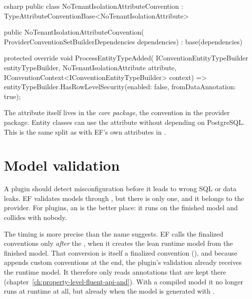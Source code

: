 \begin{sourcecode}{csharp}
public class NoTenantIsolationAttributeConvention
    : TypeAttributeConventionBase<NoTenantIsolationAttribute>
{
    public NoTenantIsolationAttributeConvention(
        ProviderConventionSetBuilderDependencies dependencies)
        : base(dependencies)
    {
    }

    protected override void ProcessEntityTypeAdded(
        IConventionEntityTypeBuilder entityTypeBuilder,
        NoTenantIsolationAttribute attribute,
        IConventionContext<IConventionEntityTypeBuilder> context)
        => entityTypeBuilder.HasRowLevelSecurity(enabled: false, fromDataAnnotation: true);
}
\end{sourcecode}

\begin{tip}
  The attribute itself lives in the \emph{core package}, the convention in the provider
  package. Entity classes can use the attribute without depending on PostgreSQL. This is the
  same split as with EF's own attributes in
  .
\end{tip}

\chapter{Model validation}\label{ch:model-validation}

A plugin should detect misconfiguration before it leads to wrong SQL or data leaks. EF
validates models through , but there is only one, and it
belongs to the provider. For plugins, an
 is the better place: it runs on
the finished model and collides with nobody.

The timing is more precise than the name suggests. EF calls the finalized conventions only
\emph{after} the , when it creates the lean runtime model
from the finished model. That conversion is itself a finalized convention
(), and because
 appends custom conventions at the end, the
plugin's validation already receives the runtime model. It therefore only reads annotations
that are kept there (chapter~\ref{ch:property-level-fluent-api-and}). With a compiled model
it no longer runs at runtime at all, but already when the model is generated with
.

